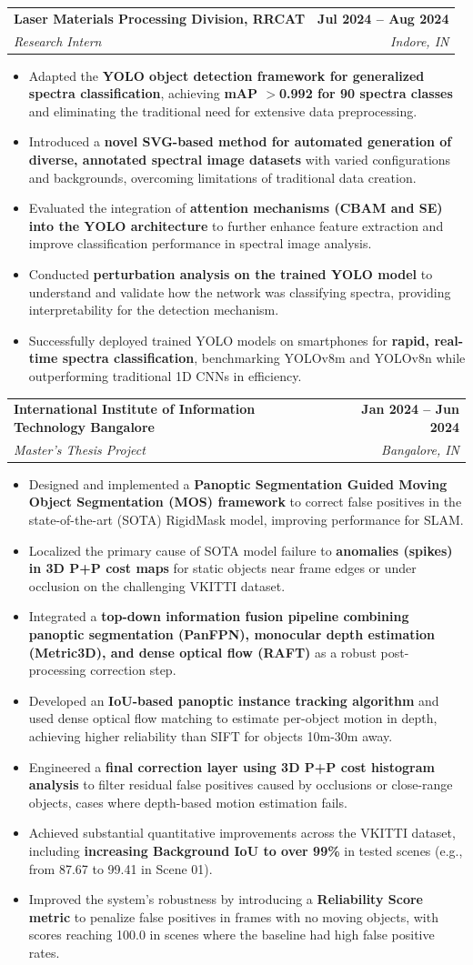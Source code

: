 \documentclass[letterpaper,11pt]{article}
\makeatletter
\newcommand{\resumeItem}[1]{
  \item\small{
    {#1 \vspace{-2pt}}
  }
}
\newcommand{\resumeSubheading}[4]{
  \vspace{-2pt}\item
    \begin{tabular*}{1.0\textwidth}[t]{l@{\extracolsep{\fill}}r}
      \textbf{#1} & \textbf{\small #2} \\
      \textit{\small#3} & \textit{\small #4} \\
    \end{tabular*}\vspace{-7pt}
}
\newcommand{\resumeItemListStart}{\begin{itemize}}
\newcommand{\resumeItemListEnd}{\end{itemize}\vspace{-5pt}}
\makeatother
\begin{document}
\resumeSubheading
{Laser Materials Processing Division, RRCAT}{Jul 2024 -- Aug 2024}
{Research Intern}{Indore, IN}
\resumeItemListStart
\resumeItem{Adapted the \textbf{YOLO object detection framework for generalized spectra classification}, achieving \textbf{mAP $>$0.992 for 90 spectra classes} and eliminating the traditional need for extensive data preprocessing.}
\resumeItem{Introduced a \textbf{novel SVG-based method for automated generation of diverse, annotated spectral image datasets} with varied configurations and backgrounds, overcoming limitations of traditional data creation.}
\resumeItem{Evaluated the integration of \textbf{attention mechanisms (CBAM and SE) into the YOLO architecture} to further enhance feature extraction and improve classification performance in spectral image analysis.}
\resumeItem{Conducted \textbf{perturbation analysis on the trained YOLO model} to understand and validate how the network was classifying spectra, providing interpretability for the detection mechanism.}
\resumeItem{Successfully deployed trained YOLO models on smartphones for \textbf{rapid, real-time spectra classification}, benchmarking YOLOv8m and YOLOv8n while outperforming traditional 1D CNNs in efficiency.}
\resumeItemListEnd

\resumeSubheading
{International Institute of Information Technology Bangalore}{Jan 2024 -- Jun 2024}
{Master's Thesis Project}{Bangalore, IN}
\resumeItemListStart
\resumeItem{Designed and implemented a \textbf{Panoptic Segmentation Guided Moving Object Segmentation (MOS) framework} to correct false positives in the state-of-the-art (SOTA) RigidMask model, improving performance for SLAM.}
\resumeItem{Localized the primary cause of SOTA model failure to \textbf{anomalies (spikes) in 3D P+P cost maps} for static objects near frame edges or under occlusion on the challenging VKITTI dataset.}
\resumeItem{Integrated a \textbf{top-down information fusion pipeline combining panoptic segmentation (PanFPN), monocular depth estimation (Metric3D), and dense optical flow (RAFT)} as a robust post-processing correction step.}
\resumeItem{Developed an \textbf{IoU-based panoptic instance tracking algorithm} and used dense optical flow matching to estimate per-object motion in depth, achieving higher reliability than SIFT for objects 10m-30m away.}
\resumeItem{Engineered a \textbf{final correction layer using 3D P+P cost histogram analysis} to filter residual false positives caused by occlusions or close-range objects, cases where depth-based motion estimation fails.}
\resumeItem{Achieved substantial quantitative improvements across the VKITTI dataset, including \textbf{increasing Background IoU to over 99\%} in tested scenes (e.g., from 87.67 to 99.41 in Scene 01).}
\resumeItem{Improved the system's robustness by introducing a \textbf{Reliability Score metric} to penalize false positives in frames with no moving objects, with scores reaching 100.0 in scenes where the baseline had high false positive rates.}
\resumeItemListEnd
\end{document}
